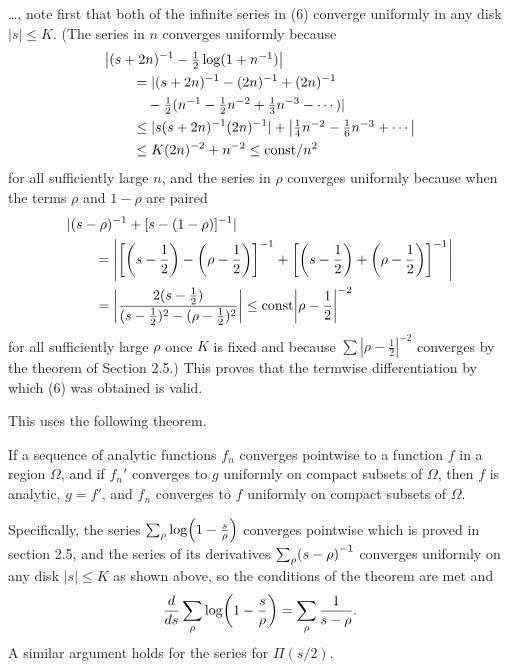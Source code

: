 \documentclass[12pt]{note}
\numberwithin{equation}{chapter}
\begin{document}
\begin{quotebox}
  \dots, note first that both of the infinite series in (6) converge uniformly in
  any disk \( |s| \leq K \). (The series in \( n \) converges uniformly because
  \begin{align*}
     & \abs{(s + 2n)^{-1} - \textstyle\frac{1}{2} \log(1 + n^{-1})}      \\
     & \qquad = |(s + 2n)^{-1} - (2n)^{-1} + (2n)^{-1}                   \\
     & \qquad \quad - \textstyle\frac{1}{2}(n^{-1} - \frac{1}{2}n^{-2} +
    \frac{1}{3}n^{-3} - \cdots )|                                        \\
     & \qquad \leq |s(s + 2n)^{-1}(2n)^{-1}| + \textstyle \abs{
    \frac{1}{4}n^{-2} - \frac{1}{6}n^{-3} + \cdots}                      \\
     & \qquad \leq K(2n)^{-2} + n^{-2} \leq \text{const}/n^2
  \end{align*}
  for all sufficiently large \( n \), and the series in \( \rho \) converges
  uniformly because when the terms \( \rho \) and \( 1 - \rho \) are paired
  \begin{align*}
     & |(s - \rho)^{-1} + [s - (1 - \rho)]^{-1}|                          \\
     & \qquad = \left| \left[\prn{s - \frac{1}{2}} - \prn{\rho -
        \frac{1}{2}}\right]^{-1} + \left[\prn{s - \frac{1}{2}} +
    \prn{\rho - \frac{1}{2}}\right]^{-1} \right|                          \\
     & \qquad = \left\lvert \frac{2(s - \frac{1}{2})}{(s - \frac{1}{2})^2
      - (\rho - \frac{1}{2})^2} \right\rvert
    \leq \text{const} \left\lvert \rho - \frac{1}{2} \right\rvert^{-2}
  \end{align*}
  for all sufficiently large \( \rho \) once \( K \) is fixed and because \( \sum
  |\rho - \frac{1}{2}|^{-2} \) converges by the theorem of Section 2.5.) This proves
  that the termwise differentiation by which (6) was obtained is valid.
\end{quotebox}

This uses the following theorem.
\begin{theorem*}
  If a sequence of analytic functions \( f_n
  \) converges pointwise to a function \( f \) in a region \( \Omega \), and if
  \( f_n' \) converges to \( g \) uniformly on compact subsets of \( \Omega \),
  then \( f \) is analytic, \( g = f' \), and \( f_n \) converges to \( f \)
  uniformly on compact subsets of \( \Omega \).
\end{theorem*}

Specifically, the series $\sum_\rho\log\prn{1 - \frac{s}{\rho}}$ converges pointwise
which is proved in section 2.5, and the series of its derivatives $\sum_\rho\prn{s -
\rho}^{-1}$ converges uniformly on any disk $|s| \leq K$ as shown above, so the
conditions of the theorem are met and
\begin{equation*}
  \frac{d}{ds} \sum_\rho\log\prn{1 - \frac{s}{\rho}} = \sum_\rho\frac{1}{s - \rho}.
\end{equation*}
A similar argument holds for the series for $\Pi(s/2)$.




\end{document}
